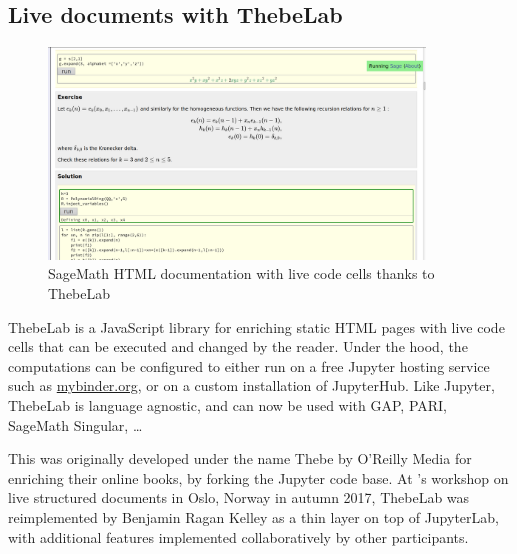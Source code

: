 \documentclass{deliverablereport}
\begin{document}
\subsection{Live documents with ThebeLab}

\begin{figure}[h]\label{thebelab}
\includegraphics[width=100mm]{thebelab.png}
\caption{SageMath HTML documentation with live code cells thanks to ThebeLab}
\end{figure}

ThebeLab is a JavaScript library for enriching static HTML pages with live code cells
that can be executed and changed by the reader.
Under the hood, the computations can be configured to either run on a free Jupyter hosting service
such as \url{mybinder.org}, or on a custom installation of JupyterHub. Like Jupyter, ThebeLab
is language agnostic, and can now be used with GAP, PARI, SageMath Singular, \ldots

This was originally developed under the name Thebe by O'Reilly Media
for enriching their online books, by forking the Jupyter code base.
At \ODK's workshop on live structured documents in Oslo, Norway in autumn 2017, ThebeLab was
reimplemented by Benjamin Ragan Kelley as a thin layer on top of JupyterLab, with additional
features implemented collaboratively by other participants.
\end{document}
